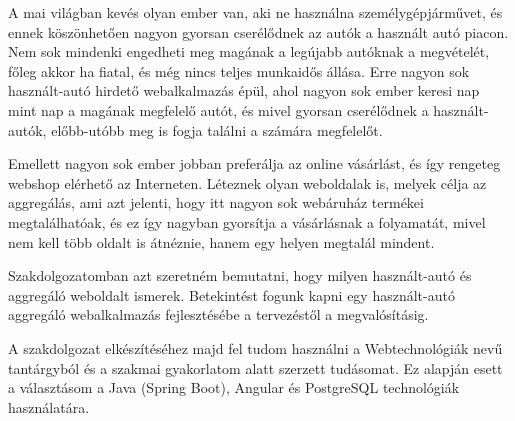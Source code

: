 
A mai világban kevés olyan ember van, aki ne használna személygépjárművet, és ennek köszönhetően nagyon gyorsan cserélődnek az autók a használt autó piacon. Nem sok mindenki engedheti meg magának a legújabb autóknak a megvételét, főleg akkor ha fiatal, és még nincs teljes munkaidős állása. Erre nagyon sok használt-autó hirdető webalkalmazás épül, ahol nagyon sok ember keresi nap mint nap a magának megfelelő autót, és mivel gyorsan cserélődnek a használt-autók, előbb-utóbb meg is fogja találni a számára megfelelőt.

Emellett nagyon sok ember jobban preferálja az online vásárlást, és így rengeteg webshop elérhető az Interneten. Léteznek olyan weboldalak is, melyek célja az aggregálás, ami azt jelenti, hogy itt nagyon sok webáruház termékei megtalálhatóak, és ez így nagyban gyorsítja a vásárlásnak a folyamatát, mivel nem kell több oldalt is átnéznie, hanem egy helyen megtalál mindent.

Szakdolgozatomban azt szeretném bemutatni, hogy milyen használt-autó és aggregáló weboldalt ismerek. Betekintést fogunk kapni egy használt-autó aggregáló webalkalmazás fejlesztésébe a tervezéstől a megvalósításig. 

A szakdolgozat elkészítéséhez majd fel tudom használni a Webtechnológiák nevű tantárgyból és a szakmai gyakorlatom alatt szerzett tudásomat. Ez alapján esett a választásom a Java (Spring Boot), Angular és PostgreSQL technológiák használatára.